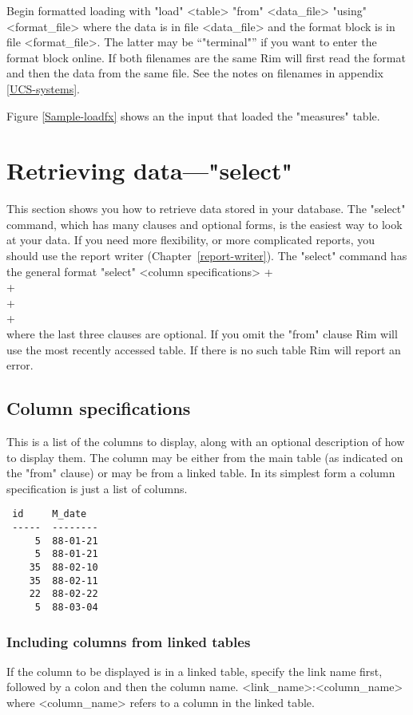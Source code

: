 Begin formatted loading with
\<"load" <table> "from" <data_file> "using" <format_file>\>
where the data is in file <data_file> and the format block
is in file <format_file>. The latter may be ``"terminal"''
if you want to enter the format block online.
If both filenames are the same Rim will first read the
format and then the data from the same file.
See the notes on filenames in appendix \ref{UCS-systems}.
 
Figure \ref{Sample-loadfx} shows an the input that loaded
the "measures" table.
 
 
\section{Retrieving data---"select"}
%
This section shows you how to retrieve data stored in
your database.
The "select" command, which has many clauses and optional forms,
is the easiest way to look at your data.
If you need more flexibility, or more complicated reports,
you should use the report writer (Chapter~\ref{report-writer}).
The "select" command has the general format
\<"select" <column specifications> + \\
  \qquad {} + \\
  \qquad {} + \\
  \qquad {} + \\
  \qquad {}\>
where the last three clauses are optional.
If you omit the "from" clause Rim will use the most recently
accessed table.  If there is no such table
Rim will report an error.
 
\subsection{Column specifications}
%
This is a list of the columns to display, along with an optional
description of how to display them.  The column may be either
from the main table (as indicated on the "from" clause) or may
be from a linked table.
In its simplest form a column specification is just a list of columns.
 
\begin{verbatim}
 id     M_date
 -----  --------
     5  88-01-21
     5  88-01-21
    35  88-02-10
    35  88-02-11
    22  88-02-22
     5  88-03-04
\end{verbatim}
\enddemo
 
\subsubsection{Including columns from linked tables}
%
If the column to be displayed is in a linked table, specify
the link name first, followed by a colon and then the column name.
\<<link_name>:<column_name>\>
where <column_name> refers to a column in the linked table.
 
